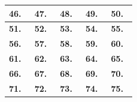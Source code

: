 \vspace{0.8cm}
\begin{center}
\renewcommand{\arraystretch}{1.9}
\begin{tabular}{|p{2.7cm}|p{2.7cm}|p{2.7cm}|p{2.7cm}|p{2.7cm}|}
\hline
\textbf{46.}\ \underline{\hspace{1.3cm}} & \textbf{47.}\ \underline{\hspace{1.3cm}} & \textbf{48.}\ \underline{\hspace{1.3cm}} & \textbf{49.}\ \underline{\hspace{1.3cm}} & \textbf{50.}\ \underline{\hspace{1.3cm}} \\
\hline
\textbf{51.}\ \underline{\hspace{1.3cm}} & \textbf{52.}\ \underline{\hspace{1.3cm}} & \textbf{53.}\ \underline{\hspace{1.3cm}} & \textbf{54.}\ \underline{\hspace{1.3cm}} & \textbf{55.}\ \underline{\hspace{1.3cm}} \\
\hline
\textbf{56.}\ \underline{\hspace{1.3cm}} & \textbf{57.}\ \underline{\hspace{1.3cm}} & \textbf{58.}\ \underline{\hspace{1.3cm}} & \textbf{59.}\ \underline{\hspace{1.3cm}} & \textbf{60.}\ \underline{\hspace{1.3cm}} \\
\hline
\textbf{61.}\ \underline{\hspace{1.3cm}} & \textbf{62.}\ \underline{\hspace{1.3cm}} & \textbf{63.}\ \underline{\hspace{1.3cm}} & \textbf{64.}\ \underline{\hspace{1.3cm}} & \textbf{65.}\ \underline{\hspace{1.3cm}} \\
\hline
\textbf{66.}\ \underline{\hspace{1.3cm}} & \textbf{67.}\ \underline{\hspace{1.3cm}} & \textbf{68.}\ \underline{\hspace{1.3cm}} & \textbf{69.}\ \underline{\hspace{1.3cm}} & \textbf{70.}\ \underline{\hspace{1.3cm}} \\
\hline
\textbf{71.}\ \underline{\hspace{1.3cm}} & \textbf{72.}\ \underline{\hspace{1.3cm}} & \textbf{73.}\ \underline{\hspace{1.3cm}} & \textbf{74.}\ \underline{\hspace{1.3cm}} & \textbf{75.}\ \underline{\hspace{1.3cm}} \\

\end{tabular}
\end{center}
